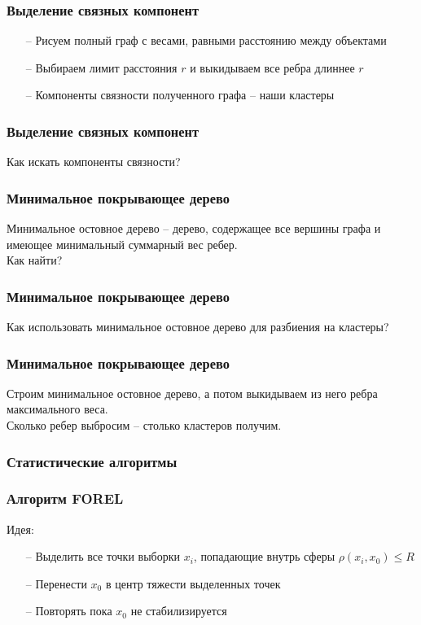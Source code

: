 \documentclass[12pt]{beamer}
\begin{document}
\begin{frame}\frametitle{Выделение связных компонент}
\begin{itemize}
\item[--] Рисуем полный граф с весами, равными расстоянию между объектами
\item[--] Выбираем лимит расстояния $r$ и выкидываем все ребра длиннее $r$
\item[--] Компоненты связности полученного графа -- наши кластеры
\end{itemize}
\end{frame}

\begin{frame}\frametitle{Выделение связных компонент}
Как искать компоненты связности?
\end{frame}

\begin{frame}\frametitle{Минимальное покрывающее дерево}
Минимальное остовное дерево -- дерево, содержащее все вершины графа и имеющее минимальный суммарный вес ребер.\\
\vspace{5mm}
Как найти?
\end{frame}

\begin{frame}\frametitle{Минимальное покрывающее дерево}
Как использовать минимальное остовное дерево для разбиения на кластеры?
\end{frame}
\begin{frame}\frametitle{Минимальное покрывающее дерево}
Строим минимальное остовное дерево, а потом выкидываем из него ребра максимального веса.\\
\vspace{5mm}
Сколько ребер выбросим -- столько кластеров получим.
\end{frame}

\begin{frame}\frametitle{Статистические алгоритмы}
\end{frame}

\begin{frame}\frametitle{Алгоритм FOREL}
Идея:\\
\begin{itemize}
\item[--] Выделить все точки выборки $x_i$, попадающие внутрь сферы $\rho(x_i, x_0) \leq R$
\item[--] Перенести $x_0$ в центр тяжести выделенных точек
\item[--] Повторять пока $x_0$ не стабилизируется
\end{itemize}

\end{frame}
\end{document}
